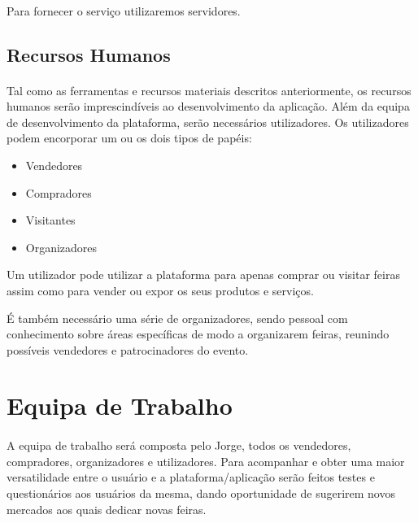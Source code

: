 \documentclass[a4paper,12pt]{scrreprt}
\begin{document}
            \paragraph{}
            Para fornecer o serviço utilizaremos servidores.
            
        \subsection{Recursos Humanos}
            \paragraph{}
            Tal como as ferramentas e recursos materiais descritos anteriormente, os recursos humanos serão imprescindíveis ao desenvolvimento da aplicação. Além da equipa de desenvolvimento da plataforma, serão necessários utilizadores. Os utilizadores podem encorporar um ou os dois tipos de papéis:
            \begin{itemize}
                \item Vendedores
                \item Compradores
                \item Visitantes
                \item Organizadores
            \end{itemize}
            
            Um utilizador pode utilizar a plataforma para apenas comprar ou visitar feiras assim como para vender ou expor os seus produtos e serviços.
            
            É também necessário uma série de organizadores, sendo pessoal com conhecimento sobre áreas específicas de modo a organizarem feiras, reunindo possíveis vendedores e patrocinadores do evento.
    
    \section{Equipa de Trabalho}
        \paragraph{}
        A equipa de trabalho será composta pelo Jorge, todos os vendedores, compradores, organizadores e utilizadores. Para acompanhar e obter uma maior versatilidade entre o usuário e a plataforma/aplicação serão feitos testes e questionários aos usuários da mesma, dando oportunidade de sugerirem novos mercados aos quais dedicar novas feiras.
\end{document}
